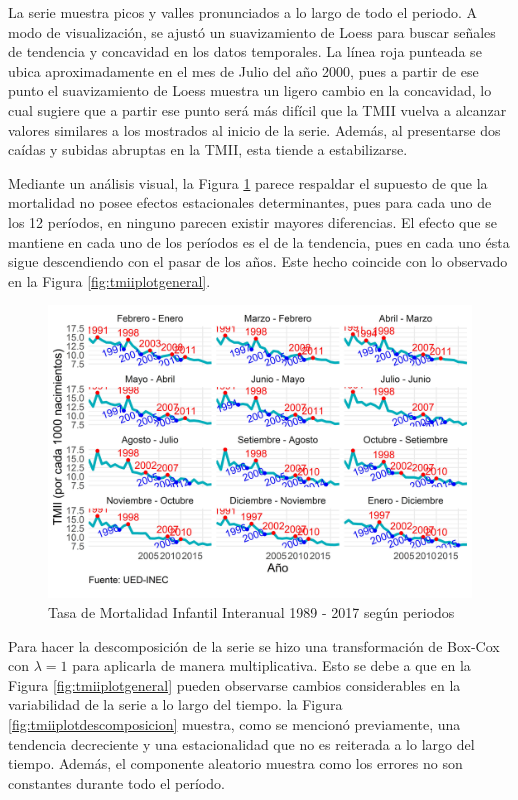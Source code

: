 \documentclass[
]{article}
\begin{document}
La serie muestra picos y valles pronunciados a lo largo de todo el
periodo. A modo de visualización, se ajustó un suavizamiento de Loess
para buscar señales de tendencia y concavidad en los datos temporales.
La línea roja punteada se ubica aproximadamente en el mes de Julio del
año 2000, pues a partir de ese punto el suavizamiento de Loess muestra
un ligero cambio en la concavidad, lo cual sugiere que a partir ese
punto será más difícil que la TMII vuelva a alcanzar valores similares a
los mostrados al inicio de la serie. Además, al presentarse dos caídas y
subidas abruptas en la TMII, esta tiende a estabilizarse.

Mediante un análisis visual, la Figura \ref{fig:tmiiplotperiodos} parece
respaldar el supuesto de que la mortalidad no posee efectos estacionales
determinantes, pues para cada uno de los 12 períodos, en ninguno parecen
existir mayores diferencias. El efecto que se mantiene en cada uno de
los períodos es el de la tendencia, pues en cada uno ésta sigue
descendiendo con el pasar de los años. Este hecho coincide con lo
observado en la Figura \ref{fig:tmiiplotgeneral}.

\begin{figure}[H]
\includegraphics[width=1\linewidth,height=1\textheight]{Tesis_files/figure-latex/tmiiplotperiodos-1} \caption{Tasa de Mortalidad Infantil Interanual 1989 - 2017 según periodos}\label{fig:tmiiplotperiodos}
\end{figure}

Para hacer la descomposición de la serie se hizo una transformación de
Box-Cox con \(\lambda=1\) para aplicarla de manera multiplicativa. Esto
se debe a que en la Figura \ref{fig:tmiiplotgeneral} pueden observarse
cambios considerables en la variabilidad de la serie a lo largo del
tiempo. la Figura \ref{fig:tmiiplotdescomposicion} muestra, como se
mencionó previamente, una tendencia decreciente y una estacionalidad que
no es reiterada a lo largo del tiempo. Además, el componente aleatorio
muestra como los errores no son constantes durante todo el período.
\end{document}
